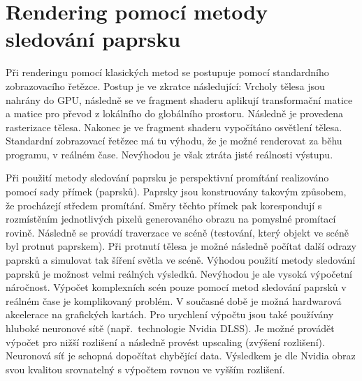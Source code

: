 \documentclass[czech,master]{diploma}
\begin{document}
\section{Rendering pomocí metody sledování paprsku}
Při renderingu pomocí klasických metod se postupuje pomocí standardního zobrazovacího řetězce. Postup je ve zkratce následující: Vrcholy tělesa jsou nahrány do GPU, následně se ve fragment shaderu aplikují transformační matice a matice pro převod z lokálního do globálního prostoru. Následně je provedena rasterizace tělesa. Nakonec je ve fragment shaderu vypočítáno osvětlení tělesa. Standardní zobrazovací řetězec má tu výhodu, že je možné renderovat za běhu programu, v reálném čase. Nevýhodou je však ztráta jisté reálnosti výstupu.\par
Při použití metody sledování paprsku je perspektivní promítání realizováno pomocí sady přímek (paprsků). Paprsky jsou konstruovány takovým způsobem, že procházejí středem promítání. Směry těchto přímek pak korespondují s rozmístěním jednotlivých pixelů generovaného obrazu na pomyslné promítací rovině. Následně se provádí traverzace ve scéně (testování, který objekt ve scéně byl protnut paprskem). Při protnutí tělesa je možné následně počítat další odrazy paprsků a simulovat tak šíření světla ve scéně. Výhodou použití metody sledování paprsků je možnost velmi reálných výsledků. Nevýhodou je ale vysoká výpočetní náročnost. Výpočet komplexních scén pouze pomocí metod sledování paprsků v reálném čase je komplikovaný problém. V současné době je možná hardwarová akcelerace na grafických kartách. Pro urychlení výpočtu jsou také používány hluboké neuronové sítě (např.\ technologie Nvidia DLSS). Je možné provádět výpočet pro nižší rozlišení a následně provést upscaling (zvýšení rozlišení). Neuronová síť je schopná dopočítat chybějící data. Výsledkem je dle Nvidia obraz svou kvalitou srovnatelný s výpočtem rovnou ve vyšším rozlišení.
\end{document}
